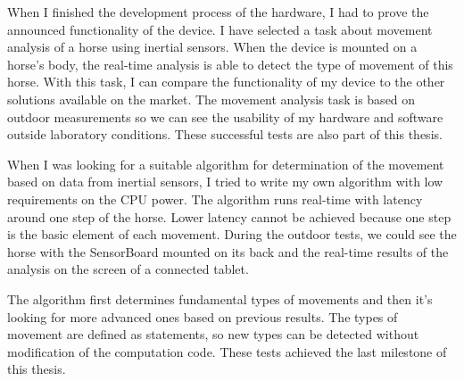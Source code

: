 When I finished the development process of the hardware, I had to prove the announced functionality of the device. I have selected a task about movement analysis of a horse using inertial sensors. When the device is mounted on a horse's body, the real-time analysis is able to detect the type of movement of this horse. With this task, I can compare the functionality of my device to the other solutions available on the market. The movement analysis task is based on outdoor measurements so we can see the usability of my hardware and software outside laboratory conditions. These successful tests are also part of this thesis.

When I was looking for a suitable algorithm for determination of the movement based on data from inertial sensors, I tried to write my own algorithm with low requirements on the CPU power. The algorithm runs real-time with latency around one step of the horse. Lower latency cannot be achieved because one step is the basic element of each movement. During the outdoor tests, we could see the horse with the SensorBoard mounted on its back and the real-time results of the analysis on the screen of a connected tablet.

The algorithm first determines fundamental types of movements and then it's looking for more advanced ones based on previous results. The types of movement are defined as statements, so new types can be detected without modification of the computation code. These tests achieved the last milestone of this thesis.
